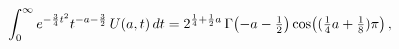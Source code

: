 \[\int_{0}^{\infty}e^{-\frac{3}{4}t^{2}}t^{-a-\frac{3}{2}}\mathop{U\/}\nolimits%
\!\left(a,t\right)dt=2^{\frac{1}{4}+\frac{1}{2}a}\mathop{\Gamma\/}\nolimits\!%
\left(-a-\tfrac{1}{2}\right)\mathop{\cos\/}\nolimits\!\left((\tfrac{1}{4}a+%
\tfrac{1}{8})\pi\right),\]